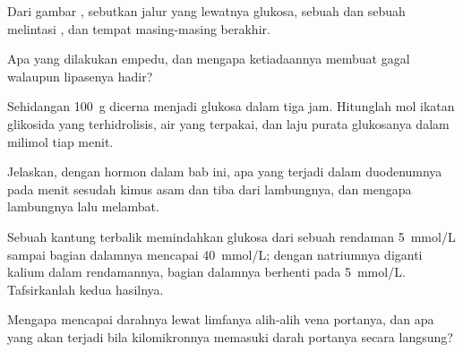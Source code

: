 \begin{exercise}[$\star$]\label{exo:b1:digestion-absorption:3}
Dari gambar , sebutkan jalur yang lewatnya glukosa, sebuah
 dan sebuah  melintasi , dan tempat
masing-masing berakhir.
\end{exercise}

\begin{exercise}[$\star$]\label{exo:b1:digestion-absorption:4}
Apa yang dilakukan empedu, dan mengapa ketiadaannya membuat 
 gagal walaupun lipasenya hadir?
\end{exercise}

\begin{exercise}[$\star\star$]\label{exo:b1:digestion-absorption:5}
Sehidangan \qty{100}{g}  dicerna menjadi glukosa dalam tiga jam.
Hitunglah mol ikatan glikosida yang terhidrolisis, air yang terpakai,
dan laju purata  glukosanya dalam milimol tiap menit.
\end{exercise}

\begin{exercise}[$\star\star$]\label{exo:b1:digestion-absorption:6}
Jelaskan, dengan hormon dalam bab ini, apa yang terjadi dalam
duodenumnya pada menit sesudah kimus asam dan  tiba dari
lambungnya, dan mengapa lambungnya lalu melambat.
\end{exercise}

\begin{exercise}[$\star\star$]\label{exo:b1:digestion-absorption:7}
Sebuah kantung terbalik memindahkan glukosa dari sebuah rendaman
\qty{5}{mmol/L} sampai bagian dalamnya mencapai \qty{40}{mmol/L};
dengan natriumnya diganti kalium dalam rendamannya, bagian dalamnya
berhenti pada \qty{5}{mmol/L}. Tafsirkanlah kedua hasilnya.
\end{exercise}

\begin{exercise}[$\star\star$]\label{exo:b1:digestion-absorption:8}
Mengapa  mencapai darahnya lewat limfanya alih-alih vena
portanya, dan apa yang akan terjadi bila kilomikronnya memasuki darah
portanya secara langsung?
\end{exercise}


